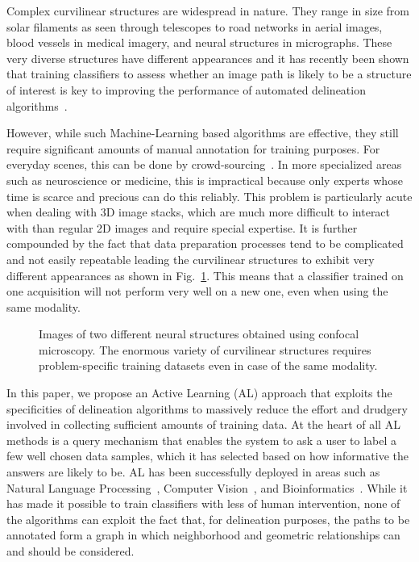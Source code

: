 \documentclass[10pt,twocolumn,letterpaper]{article}
\begin{document}
Complex curvilinear structures are widespread in nature. They range in size from
solar filaments  as seen through telescopes  to road networks in  aerial images,
blood vessels in  medical imagery, and neural structures  in micrographs.  These
very  diverse structures  have different  appearances and  it has  recently been
shown that training classifiers to assess whether  an image path is likely to be
a  structure of  interest  is  key to  improving  the  performance of  automated
delineation
algorithms~\cite{Turetken12,Turetken13a,Breitenreicher13,Santamaria-Pang15,Montoya-Zegarra14,Wegner15}.

However, while such Machine-Learning based  algorithms are effective, they still
require significant  amounts of  manual annotation  for training  purposes.  For
everyday  scenes, this  can be  done by  crowd-sourcing~\cite{Long13,Lin14}.  In
more  specialized areas  such  as neuroscience  or medicine,  this  is impractical because only  experts whose  time  is scarce  and precious  can do  this
reliably. This problem is particularly acute  when dealing with 3D image stacks,
which  are much  more difficult  to  interact with  than regular  2D images  and
require  special expertise.  It  is further  compounded by  the  fact that  data
preparation processes tend  to be complicated and not  easily repeatable leading
the curvilinear structures to exhibit very different appearances
as  shown  in  Fig.~\ref{fig:differentNeurons}.  This means  that  a  classifier
trained on one  acquisition will not perform  very well on a new  one, even when
using the same modality.

\begin{figure}[t!]
\centering
{}\hspace{0.5em}

\caption{Images of two different neural structures obtained using confocal microscopy. The enormous variety of curvilinear structures requires problem-specific training datasets even in case of the same modality.}
\label{fig:differentNeurons}
\end{figure}

In this  paper, we propose  an Active Learning  (AL) approach that  exploits the
specificities  of  delineation algorithms  to massively  reduce  the  effort  and
drudgery involved  in collecting  sufficient amounts of  training data.   At the
heart of all  AL methods is a query  mechanism that enables the system  to ask a
user to label a few well chosen data samples, which it has selected based
on  how informative  the answers  are  likely to  be.  AL  has been  successfully
deployed   in   areas   such    as   Natural   Language   Processing~\cite{Tong02},   Computer
Vision~\cite{Kapoor07},                                   and
Bioinformatics~\cite{LiuB04}.   While it  has made  it possible  to
train classifiers  with less of human  intervention, none of the algorithms can exploit the fact that, for delineation purposes,
the  paths to  be annotated  form a  graph in  which neighborhood  and geometric
relationships can and should be considered.
\end{document}
